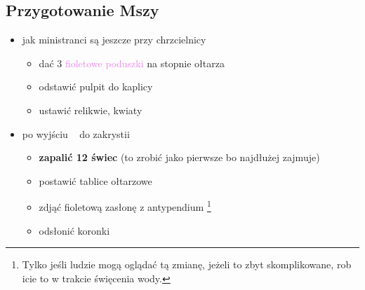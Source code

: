 \subsection{Przygotowanie Mszy}
\begin{itemize}
	\item jak ministranci są jeszcze przy chrzcielnicy
	      \begin{itemize}
		      \item dać 3 \textcolor{violet}{fioletowe poduszki} na stopnie
		            ołtarza
		      \item odstawić pulpit do kaplicy
		      \item ustawić relikwie, kwiaty
	      \end{itemize}
	\item po wyjściu \ii~ do zakrystii
	      \begin{itemize}
		      \item \textbf{zapalić 12 świec} (to zrobić jako pierwsze bo
		            najdłużej zajmuje)
		      \item postawić tablice ołtarzowe
		      \item zdjąć {\color{violet} fioletową} zasłonę z antypendium
		            \footnote{Tylko jeśli ludzie mogą oglądać tą zmianę, jeżeli
			            to zbyt skomplikowane, rob icie to w trakcie święcenia
			            wody.}
		      \item odsłonić koronki
	      \end{itemize}
\end{itemize}

